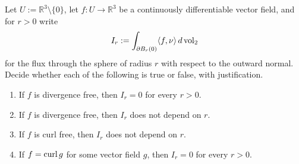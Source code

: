 \begin{exercise}
\label{ex:flux_through_nested_spheres}
Let $U := \mathbb{R}^3\setminus\{0\}$, let $f : U \to \mathbb{R}^3$ be a continuously
differentiable vector field, and for $r > 0$ write
\[I_r := \int_{\partial B_r(0)}\langle f,\nu\rangle\,d\operatorname{vol}_2\]
for the flux through the sphere of radius $r$ with respect to the outward normal. Decide whether
each of the following is true or false, with justification.
\begin{enumerate}[label=\textbf{(\alph*)}]
  \item If $f$ is divergence free, then $I_r = 0$ for every $r > 0$.
  \item If $f$ is divergence free, then $I_r$ does not depend on $r$.
  \item If $f$ is curl free, then $I_r$ does not depend on $r$.
  \item If $f = \operatorname{curl} g$ for some vector field $g$, then $I_r = 0$ for every $r > 0$.
\end{enumerate}
\end{exercise}

